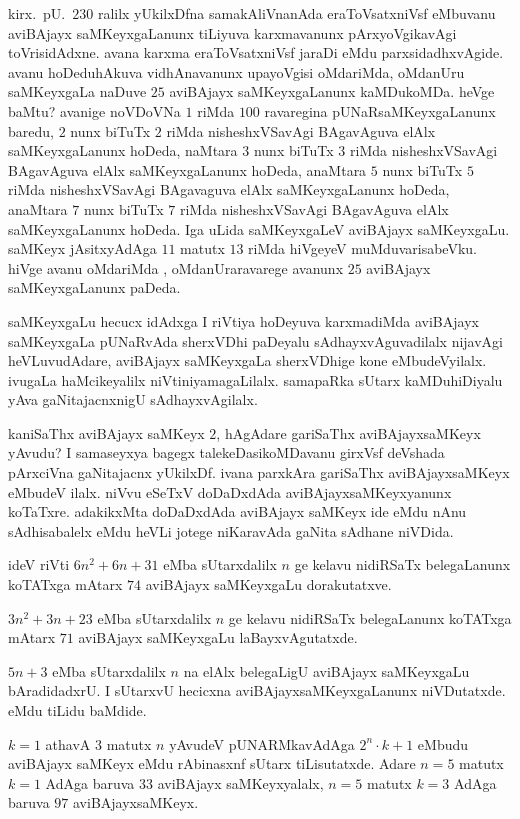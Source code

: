 kirx.~pU.\ $230$ ralilx yUkilxDfna samakAliVnanAda eraToVsatxniVsf eMbuvanu aviBAjayx saMKeyxgaLanunx tiLiyuva karxmavanunx pArxyoVgikavAgi toVrisidAdxne. avana karxma eraToVsatxniVsf jaraDi eMdu parxsidadhxvAgide. avanu hoDeduhAkuva vidhAna\-vanunx upayoVgisi oMdariMda, oMdanUru saMKeyxgaLa naDuve $25$ aviBAjayx saMKeyxgaLanunx kaMDukoMDa. heVge baMtu? avanige noVDoVNa $1$ riMda $100$ ravaregina pUNaRsaMKeyxgaLanunx baredu, $2$ nunx biTuTx $2$ riMda nisheshxVSavAgi BAgavAguva elAlx saMKeyxgaLanunx hoDeda, naMtara $3$ nunx biTuTx $3$ riMda nisheshxVSavAgi BAgavAguva elAlx saMKeyxgaLanunx hoDeda, anaMtara $5$ nunx biTuTx $5$ riMda nisheshxVSavAgi BAgavaguva elAlx saMKeyxgaLanunx hoDeda, anaMtara $7$ nunx biTuTx $7$ riMda nisheshxVSavAgi BAgavAguva elAlx saMKeyxgaLanunx hoDeda. Iga uLida saMKeyxgaLeV aviBAjayx saMKeyxgaLu. saMKeyx jAsitxyAdAga $11$ matutx $13$ riMda hiVgeyeV muMduvarisabeVku. hiVge avanu oMdariMda , oMdanUraravarege avanunx $25$ aviBAjayx saMKeyxgaLanunx paDeda.

saMKeyxgaLu hecucx idAdxga I riVtiya hoDeyuva karxmadiMda aviBAjayx saMKeyxgaLa pUNaRvAda sherxVDhi paDeyalu sAdhayxvAguvadilalx nijavAgi heVLuvudAdare, aviBAjayx saMKeyxgaLa sherxVDhige kone eMbudeVyilalx. ivugaLa haMcikeyalilx niVtiniyamagaLilalx. samapaRka sUtarx kaMDuhiDiyalu yAva gaNitajacnxnigU sAdhayxvAgilalx. 

kaniSaThx aviBAjayx saMKeyx $2$, hAgAdare gariSaThx aviBAjayxsaMKeyx yAvudu? I samaseyxya bagegx talekeDasikoMDavanu girxVsf deVshada pArxciVna gaNitajacnx yUkilxDf. ivana parxkAra gariSaThx aviBAjayxsaMKeyx eMbudeV ilalx. niVvu eSeTxV doDaDxdAda aviBAjayxsaMKeyxyanunx koTaTxre. adakikxMta doDaDxdAda aviBAjayx saMKeyx ide eMdu nAnu sAdhisabalelx eMdu heVLi jotege niKaravAda gaNita sAdhane niVDida.

ideV riVti $6n^2+6n+31$ eMba sUtarxdalilx $n$ ge kelavu nidiRSaTx belegaLanunx koTATxga mAtarx $74$ aviBAjayx saMKeyxgaLu dorakutatxve.

$3n^2+3n+23$ eMba sUtarxdalilx $n$ ge kelavu nidiRSaTx belegaLanunx koTATxga mAtarx $71$ aviBAjayx saMKeyxgaLu laBayxvAgutatxde.

$5n+3$ eMba sUtarxdalilx $n$ na elAlx belegaLigU aviBAjayx saMKeyxgaLu bAradidadxrU. I sUtarxvU hecicxna aviBAjayxsaMKeyxgaLanunx niVDutatxde. eMdu tiLidu baMdide.

$k=1$ athavA $3$ matutx $n$ yAvudeV pUNARMkavAdAga $2^{n}\cdot k+1$ eMbudu aviBAjayx saMKeyx eMdu rAbinasxnf sUtarx tiLisutatxde. Adare $n=5$ matutx $k=1$ AdAga baruva $33$ aviBAjayx saMKeyxyalalx, $n=5$ matutx $k=3$ AdAga baruva $97$ aviBAjayxsaMKeyx.

